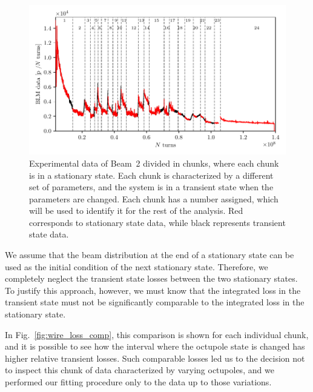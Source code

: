 \begin{figure}[hpt]
    \centering
    \includegraphics[width=1.0\textwidth]{5_wire_compensators_LHC/figs/chunks_names.pdf}
    \caption{Experimental data of Beam~2 divided in chunks, where each chunk is in a stationary state. Each chunk is characterized by a different set of parameters, and the system is in a transient state when the parameters are changed. Each chunk has a number assigned, which will be used to identify it for the rest of the analysis. Red corresponds to stationary state data, while black represents transient state data.}
    \label{fig:chunks}
\end{figure}

We assume that the beam distribution at the end of a stationary state can be used as the initial condition of the next stationary state. Therefore, we completely neglect the transient state losses between the two stationary states. To justify this approach, however, we must know that the integrated loss in the transient state must not be significantly comparable to the integrated loss in the stationary state.

In Fig.~\ref{fig:wire_loss_comp}, this comparison is shown for each individual chunk, and it is possible to see how the interval where the octupole state is changed has higher relative transient losses. Such comparable losses led us to the decision not to inspect this chunk of data characterized by varying octupoles, and we performed our fitting procedure only to the data up to those variations.

